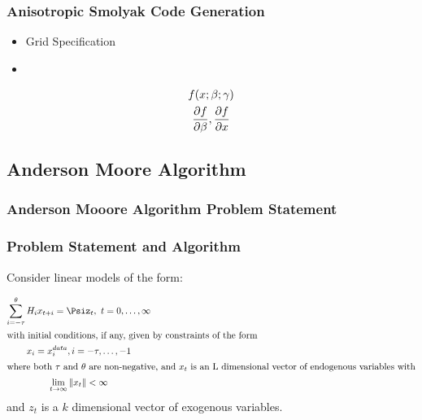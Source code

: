 \documentclass{beamer}
\begin{document}
\begin{frame}
  \frametitle{Anisotropic Smolyak Code Generation}
  
  \begin{itemize}
  \item Grid Specification
  \item \mma
  \end{itemize}
  \begin{gather*}
    f(x;\beta;\gamma)\\
\frac{\partial f}{\partial \beta},\frac{\partial f}{\partial x}
  \end{gather*}

\end{frame}


  

  




\subsection{Anderson Moore Algorithm }

  \subsubsection{Anderson Mooore Algorithm Problem Statement}


\begin{frame}
  \frametitle{Problem Statement and Algorithm}
  
{\small  

Consider linear models of the form\cite{anderson10}:


\begin{gather}
\sum_{i=-\tau}^\theta{H_i x_{t+i}}= \Psi%
z_{t}, \,\, t = 0,\ldots,\infty\label{eq:canonical}\\ \intertext{with initial conditions, if any, given by constraints of the form}%
x_i  =  x^{data}_i,  i =  - \tau, \ldots, -1\label{eq:init}\\ \intertext{where both $\tau$ and $\theta$ are non-negative, and $x_t$ is an L dimensional vector 
of endogenous variables with}%
\lim_{ t \rightarrow\infty} \|x_t\|   < \infty\label{eq:limit} %
\end{gather}
{ and $z_t$ is a $k$ dimensional vector of exogenous variables.}

}

\end{frame}
\end{document}
